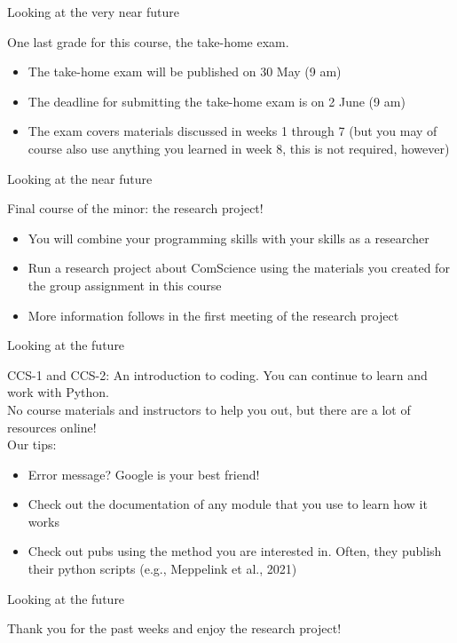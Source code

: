 \documentclass[handout]{beamer}
\begin{document}
\begin{frame}{Looking at the very near future} 
	
One last grade for this course, the take-home exam.
	\begin{itemize}
		\item The take-home exam will be published on 30 May (9 am)
		\item The deadline for submitting the take-home exam is on 2 June (9 am)
		\item The exam covers materials discussed in weeks 1 through 7 (but you may of course also use anything you learned in week 8, this is not required, however) 
	\end{itemize}
	
\end{frame}

\begin{frame}{Looking at the near future} 
	
Final course of the minor: the research project!
\begin{itemize}
		\item You will combine your programming skills with your skills as a researcher
		\item Run a research project about ComScience using the materials you created for the group assignment in this course
		\item More information follows in the first meeting of the research project
\end{itemize}
\end{frame}

\begin{frame}{Looking at the future} 
	
CCS-1 and CCS-2: An introduction to coding. You can continue to learn and work with Python.\\
No course materials and instructors to help you out, but there are a lot of resources online!\\
Our tips:
	\begin{itemize}
		\item Error message? Google is your best friend!
		\item Check out the documentation of any module that you use to learn how it works
		\item Check out pubs using the method you are interested in. Often, they publish their python scripts (e.g., Meppelink et al., 2021)
	\end{itemize}
	
\end{frame}



\begin{frame}{Looking at the future} 
	
Thank you for the past weeks and enjoy the research project!

\end{frame}
\end{document}
